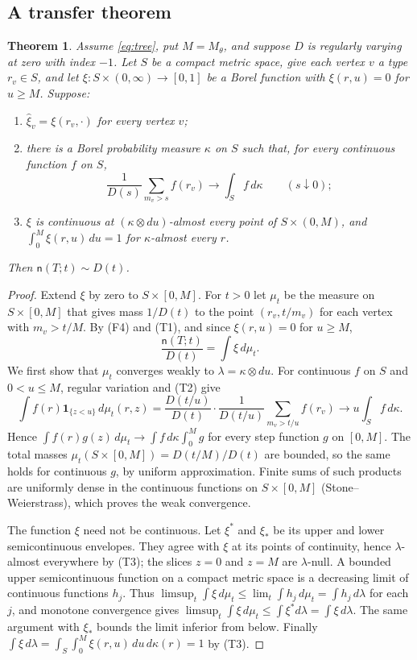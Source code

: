 \documentclass[11pt]{article}
\newtheorem{theorem}{Theorem}[section]
\theoremstyle{definition}
\theoremstyle{remark}
\newcommand{\one}{\mathbf 1}
\newcommand{\ncount}{\mathsf n}
\begin{document}
\subsection{A transfer theorem}
\begin{theorem}\label{thm:census}
Assume \eqref{eq:tree}, put $M=M_\theta$, and suppose $D$ is regularly
varying at zero with index $-1$. Let $S$ be a compact metric space, give
each vertex $v$ a type $r_v\in S$, and let
$\xi\colon S\times(0,\infty)\to[0,1]$ be a Borel function with
$\xi(r,u)=0$ for $u\ge M$. Suppose:
\begin{enumerate}
\item[(T1)] $\widehat\xi_v=\xi(r_v,\cdot)$ for every vertex $v$;
\item[(T2)] there is a Borel probability measure $\kappa$ on $S$ such
 that, for every continuous function $f$ on $S$,
 \[
 \frac1{D(s)}\sum_{m_v>s}f(r_v)\longrightarrow\int_Sf\,d\kappa
 \qquad(s\downarrow0);
 \]
\item[(T3)] $\xi$ is continuous at $(\kappa\otimes du)$-almost every
 point of $S\times(0,M)$, and $\int_0^M\xi(r,u)\,du=1$ for
 $\kappa$-almost every $r$.
\end{enumerate}
Then $\ncount(T;t)\sim D(t)$.
\end{theorem}
\begin{proof}
Extend $\xi$ by zero to $S\times[0,M]$. For $t>0$ let $\mu_t$ be the
measure on $S\times[0,M]$ that gives mass $1/D(t)$ to the point
$(r_v,t/m_v)$ for each vertex with $m_v>t/M$. By (F4) and (T1), and
since $\xi(r,u)=0$ for $u\ge M$,
\[
 \frac{\ncount(T;t)}{D(t)}=\int\xi\,d\mu_t .
\]
We first show that $\mu_t$ converges weakly to $\lambda=\kappa\otimes du$.
For continuous $f$ on $S$ and $0<u\le M$, regular variation and (T2) give
\[
 \int f(r)\one_{\{z<u\}}\,d\mu_t(r,z)
 =\frac{D(t/u)}{D(t)}\cdot\frac1{D(t/u)}\sum_{m_v>t/u}f(r_v)
 \longrightarrow u\int_Sf\,d\kappa .
\]
Hence $\int f(r)g(z)\,d\mu_t\to\int f\,d\kappa\int_0^Mg$ for every step
function $g$ on $[0,M]$. The total masses $\mu_t(S\times[0,M])=D(t/M)/D(t)$
are bounded, so the same holds for continuous $g$, by uniform
approximation. Finite sums of such products are uniformly dense in the
continuous functions on $S\times[0,M]$ (Stone--Weierstrass), which
proves the weak convergence.

The function $\xi$ need not be continuous. Let $\xi^*$ and $\xi_*$ be its
upper and lower semicontinuous envelopes. They agree with $\xi$ at its
points of continuity, hence $\lambda$-almost everywhere by (T3); the
slices $z=0$ and $z=M$ are $\lambda$-null. A bounded upper semicontinuous
function on a compact metric space is a decreasing limit of continuous
functions $h_j$. Thus
$\limsup_t\int\xi\,d\mu_t\le\lim_t\int h_j\,d\mu_t=\int h_j\,d\lambda$ for
each $j$, and monotone convergence gives
$\limsup_t\int\xi\,d\mu_t\le\int\xi^*d\lambda=\int\xi\,d\lambda$. The same
argument with $\xi_*$ bounds the limit inferior from below. Finally
$\int\xi\,d\lambda=\int_S\int_0^M\xi(r,u)\,du\,d\kappa(r)=1$ by (T3).
\end{proof}
\end{document}
